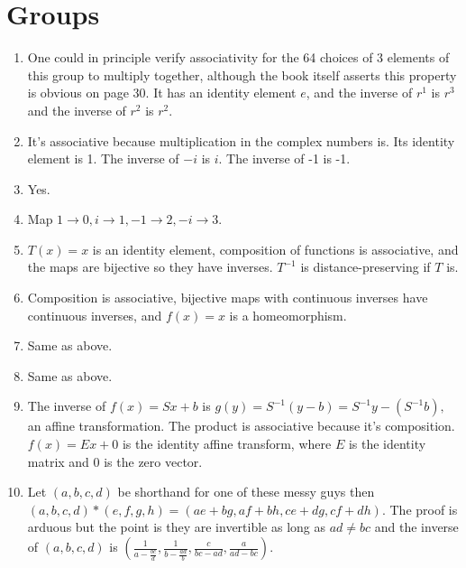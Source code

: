 \documentclass[11pt, oneside]{article}   	%
\newcommand{\inv}{^{-1}}
\newcommand{\be}{\begin{enumerate}}
\newcommand{\ee}{\end{enumerate}}
\begin{document}
\section{Groups}
\be
\item One could in principle verify associativity for the 64 choices of 3 elements of this group to multiply together, although the book itself asserts this property is obvious on page 30. It has an identity element $e$, and the inverse of $r^1$ is $r^3$ and the inverse of $r^2$ is $r^2$.
\item It's associative because multiplication in the complex numbers is. Its identity element is 1. The inverse of $-i$ is $i$. The inverse of -1 is -1.
\item Yes.
\item Map $1 \rightarrow 0, i \rightarrow 1, -1 \rightarrow 2, -i \rightarrow 3$. 
\item $T(x) = x$ is an identity element, composition of functions is associative, and the maps are bijective so they have inverses. $T\inv$ is distance-preserving if $T$ is.
\item Composition is associative, bijective maps with continuous inverses have continuous inverses, and $f(x) = x$ is a homeomorphism.
\item Same as above.
\item Same as above.
\item The inverse of $f(x) = Sx + b$ is $g(y) = S\inv(y - b) = S\inv y - (S\inv b),$ an affine transformation. The product is associative because it's composition. $f(x) = Ex + 0$ is the identity affine transform, where $E$ is the identity matrix and 0 is the zero vector.
\item Let $(a, b, c, d)$ be shorthand for one of these messy guys then $(a, b, c, d) * (e, f, g, h) = (ae + bg, af + bh, ce + dg, cf + dh)$. The proof is arduous but the point is they are invertible as long as $ad \not = bc$ and the inverse of $(a, b, c, d)$ is $(\frac{1}{a - \frac{bc}{d}}, \frac{1}{b - \frac{ad}{b}}, \frac{c}{bc - ad}, \frac{a}{ad - bc})$.
\ee
\end{document}
